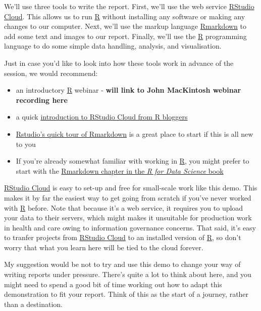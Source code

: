 \documentclass[
]{article}
\providecommand{\tightlist}{%
  \setlength{\itemsep}{0pt}\setlength{\parskip}{0pt}}
\begin{document}
We'll use three tools to write the report. First, we'll use the web
service \href{https://rstudio.cloud}{RStudio Cloud}. This allows us to
run \href{https://www.r-project.org/}{R} without installing any software
or making any changes to our computer. Next, we'll use the markup
language \href{http://rmarkdown.rstudio.com}{Rmarkdown} to add some text
and images to our report. Finally, we'll use the
\href{https://www.r-project.org/}{R} programming language to do some
simple data handling, analysis, and visualisation.

Just in case you'd like to look into how these tools work in advance of
the session, we would recommend:

\begin{itemize}
\tightlist
\item
  an introductory \href{https://www.r-project.org/}{R} webinar -
  \textbf{will link to John MacKintosh webinar recording here}
\item
  a quick
  \href{https://www.r-bloggers.com/2022/02/rstudio-cloud-how-to-get-started-for-free/}{introduction
  to RStudio Cloud from R bloggers}
\item
  \href{https://rmarkdown.rstudio.com/authoring_quick_tour.html}{Rstudio's
  quick tour of Rmarkdown} is a great place to start if this is all new
  to you
\item
  If you're already somewhat familiar with working in
  \href{https://www.r-project.org/}{R}, you might prefer to start with
  the \href{https://r4ds.had.co.nz/r-markdown.html}{Rmarkdown chapter in
  the \emph{R for Data Science} book}
\end{itemize}

\href{https://rstudio.cloud}{RStudio Cloud} is easy to set-up and free
for small-scale work like this demo. This makes it by far the easiest
way to get going from scratch if you've never worked with
\href{https://www.r-project.org/}{R} before. Note that because it's a
web service, it requires you to upload your data to their servers, which
might makes it unsuitable for production work in health and care owing
to information governance concerns. That said, it's easy to tranfer
projects from \href{https://rstudio.cloud}{RStudio Cloud} to an
installed version of \href{https://www.r-project.org/}{R}, so don't
worry that what you learn here will be tied to the cloud forever.

My suggestion would be not to try and use this demo to change your way
of writing reports under pressure. There's quite a lot to think about
here, and you might need to spend a good bit of time working out how to
adapt this demonstration to fit your report. Think of this as the start
of a journey, rather than a destination.
\end{document}
